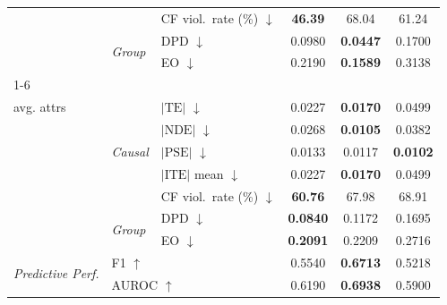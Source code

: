 \begin{table}[t]
\begin{tabular}{@{}lll ccc@{}}
  & & CF viol.\ rate (\%) $\downarrow$ & \textbf{46.39} & 68.04 & 61.24 \\
  & \multirow{2}{*}{\scriptsize\textit{Group}} & DPD $\downarrow$ & 0.0980 & \textbf{0.0447} & 0.1700 \\
  & & EO $\downarrow$ & 0.2190 & \textbf{0.1589} & 0.3138 \\
\cmidrule(lr){1-6}
  \multirow{7}{*}{\makecell[l]{\textit{Overall}\\[-2pt]\scriptsize avg. attrs}} & \multirow{5}{*}{\scriptsize\textit{Causal}} & $|\mathrm{TE}|$ $\downarrow$ & 0.0227 & \textbf{0.0170} & 0.0499 \\
  & & $|\mathrm{NDE}|$ $\downarrow$ & 0.0268 & \textbf{0.0105} & 0.0382 \\
  & & $|\mathrm{PSE}|$ $\downarrow$ & 0.0133 & 0.0117 & \textbf{0.0102} \\
  & & $|\mathrm{ITE}|$ mean $\downarrow$ & 0.0227 & \textbf{0.0170} & 0.0499 \\
  & & CF viol.\ rate (\%) $\downarrow$ & \textbf{60.76} & 67.98 & 68.91 \\
  & \multirow{2}{*}{\scriptsize\textit{Group}} & DPD $\downarrow$ & \textbf{0.0840} & 0.1172 & 0.1695 \\
  & & EO $\downarrow$ & \textbf{0.2091} & 0.2209 & 0.2716 \\
\midrule
\multirow{2}{*}{\textit{Predictive Perf.}} & \multicolumn{2}{l}{F1 $\uparrow$} & 0.5540 & \textbf{0.6713} & 0.5218 \\
  & \multicolumn{2}{l}{AUROC $\uparrow$} & 0.6190 & \textbf{0.6938} & 0.5900 \\
\bottomrule
\end{tabular}
\end{table}